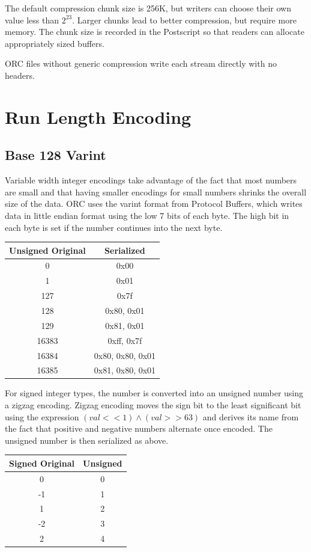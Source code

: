 \documentclass{article}
\begin{document}
The default compression chunk size is 256K, but writers can choose
their own value less than $2^{23}$.  Larger chunks lead to better
compression, but require more memory.  The chunk size is recorded in
the Postscript so that readers can allocate appropriately sized
buffers.

ORC files without generic compression write each stream directly
with no headers.

\section{Run Length Encoding}

\subsection{Base 128 Varint}

Variable width integer encodings take advantage of the fact that most
numbers are small and that having smaller encodings for small numbers
shrinks the overall size of the data. ORC uses the varint format from
Protocol Buffers, which writes data in little endian format using the
low 7 bits of each byte. The high bit in each byte is set if the
number continues into the next byte.

\vspace{10pt}
\begin{tabular}{| c | c |}
\hline
Unsigned Original & Serialized \\
\hline
0 & 0x00 \\
1 & 0x01 \\
127 & 0x7f \\
128 & 0x80, 0x01 \\
129 & 0x81, 0x01 \\
16383 & 0xff, 0x7f \\
16384 & 0x80, 0x80, 0x01 \\
16385 & 0x81, 0x80, 0x01 \\
\hline
\end{tabular}
\vspace{10pt}

For signed integer types, the number is converted into an unsigned
number using a zigzag encoding.  Zigzag encoding moves the sign bit to
the least significant bit using the expression $(val << 1) \wedge (val
>> 63)$ and derives its name from the fact that positive and negative
numbers alternate once encoded. The unsigned number is then serialized
as above.

\vspace{10pt}
\begin{tabular}{| c | c |}
\hline
Signed Original & Unsigned\\
\hline
0 & 0 \\
-1 & 1 \\
1 & 2 \\
-2 & 3 \\
2 & 4 \\
\hline
\end{tabular}
\end{document}
